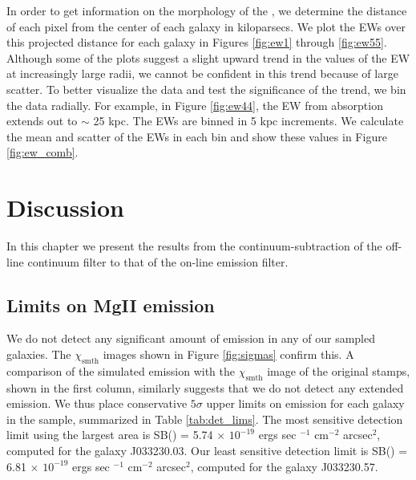 \documentclass[twocolumn]{aastex61}
\begin{document}
In order to get information on the morphology of the , we determine the distance of each pixel from the center of each galaxy in kiloparsecs. We plot the EWs over this projected distance for each galaxy in Figures \ref{fig:ew1} through \ref{fig:ew55}. Although some of the plots suggest a slight upward trend in the values of the EW at increasingly large radii, we cannot be confident in this trend because of large scatter. To better visualize the data and test the significance of the trend, we bin the data radially. For example, in Figure \ref{fig:ew44}, the EW from absorption extends out to $\sim$ 25 kpc. The EWs are binned in 5 kpc increments. We calculate the mean and scatter of the EWs in each bin and show these values in Figure \ref{fig:ew_comb}.   


\section{Discussion}\label{sec.results}
In this chapter we present the results from the continuum-subtraction of the off-line continuum filter to that of the on-line emission filter. 

\subsection{Limits on MgII emission}

We do not detect any significant amount of  emission in any of our sampled galaxies. The $\chi_{\text{smth}}$ images shown in Figure \ref{fig:sigmas} confirm this. A comparison of the simulated emission with the $\chi_{\text{smth}}$ image of the original stamps, shown in the first column, similarly suggests that we do not detect any extended  emission. We thus place conservative $5\sigma$ upper limits on  emission for each galaxy in the sample, summarized in Table \ref{tab:det_lims}. The most sensitive detection limit using the largest area is SB() = 5.74 $\times$ $10^{-19}$ ergs sec $^{-1}$ cm$^{-2}$ arcsec$^2$, computed for the galaxy J033230.03. Our least sensitive detection limit is SB() = 6.81 $\times$ $10^{-19}$ ergs sec $^{-1}$ cm$^{-2}$ arcsec$^2$, computed for the galaxy J033230.57.
\end{document}
